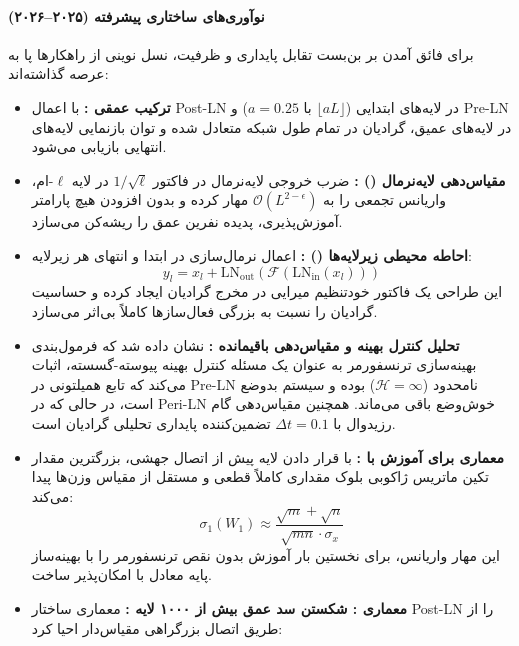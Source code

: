 \paragraph*{نوآوری‌های ساختاری پیشرفته (۲۰۲۵–۲۰۲۶)}
برای فائق آمدن بر بن‌بست تقابل پایداری و ظرفیت، نسل نوینی از راهکارها پا به عرصه گذاشته‌اند:
\begin{itemize}
    \item \textbf{ترکیب عمقی  \cite{li2025mixln}:} با اعمال Post-LN در لایه‌های ابتدایی ($\lfloor aL \rfloor$ با $a=0.25$) و Pre-LN در لایه‌های عمیق، گرادیان در تمام طول شبکه متعادل شده و توان بازنمایی لایه‌های انتهایی بازیابی می‌شود.
    \item \textbf{مقیاس‌دهی لایه‌نرمال () \cite{sun2025curse}:} ضرب خروجی لایه‌نرمال در فاکتور $1/\sqrt{\ell}$ در لایه $\ell$-ام، واریانس تجمعی را به $\mathcal{O}(L^{2-\epsilon})$ مهار کرده و بدون افزودن هیچ پارامتر آموزش‌پذیری، پدیده نفرین عمق را ریشه‌کن می‌سازد.
    \item \textbf{احاطه محیطی زیرلایه‌ها () \cite{kim2025periln}:} اعمال نرمال‌سازی در ابتدا و انتهای هر زیرلایه:
    \begin{equation}
        y_l = x_l + \text{LN}_{\text{out}}\left(\mathcal{F}\left(\text{LN}_{\text{in}}(x_l)\right)\right)
    \end{equation}
    این طراحی یک فاکتور خودتنظیم میرایی در مخرج گرادیان ایجاد کرده و حساسیت گرادیان را نسبت به بزرگی فعال‌سازها کاملاً بی‌اثر می‌سازد.
    \item \textbf{تحلیل کنترل بهینه و مقیاس‌دهی باقیمانده \cite{kan2026stability}:} نشان داده شد که فرمول‌بندی بهینه‌سازی ترنسفورمر به عنوان یک مسئله کنترل بهینه پیوسته-گسسته، اثبات می‌کند که تابع همیلتونی در Pre-LN نامحدود ($\mathcal{H} = \infty$) بوده و سیستم بدوضع است، در حالی که در Peri-LN خوش‌وضع باقی می‌ماند. همچنین مقیاس‌دهی گام رزیدوال با $\Delta t = 0.1$ تضمین‌کننده پایداری تحلیلی گرادیان است.
    \item \textbf{معماری  برای آموزش با  \cite{qi2025dnt}:} با قرار دادن لایه  پیش از اتصال جهشی، بزرگترین مقدار تکین ماتریس ژاکوبی بلوک مقداری کاملاً قطعی و مستقل از مقیاس وزن‌ها پیدا می‌کند:
    \begin{equation}
        \sigma_1(W_1) \approx \frac{\sqrt{m}+\sqrt{n}}{\sqrt{mn} \cdot \sigma_x}
    \end{equation}
    این مهار واریانس، برای نخستین بار آموزش بدون نقص ترنسفورمر را با بهینه‌ساز پایه  معادل با  امکان‌پذیر ساخت.
    \item \textbf{معماری : شکستن سد عمق بیش از ۱۰۰۰ لایه \cite{chen2026keel}:} معماری  ساختار Post-LN را از طریق اتصال بزرگراهی مقیاس‌دار احیا کرد:

\end{itemize}
